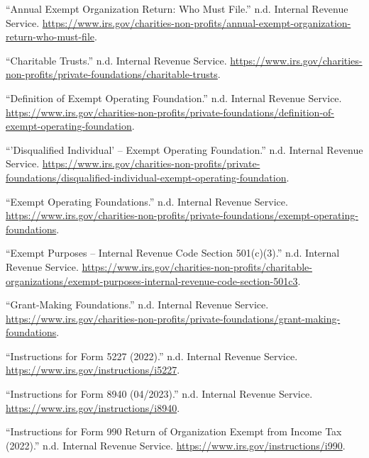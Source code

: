 \documentclass[
  letterpaper,
  DIV=11,
  numbers=noendperiod]{scrreprt}
\newlength{\cslhangindent}
\newlength{\cslentryspacingunit} %
\newenvironment{CSLReferences}[2] %
 {%
  \setlength{\parindent}{0pt}
  \ifodd #1
  \let\oldpar\par
  \def\par{\hangindent=\cslhangindent\oldpar}
  \fi
  \setlength{\parskip}{#2\cslentryspacingunit}
 }%
 {}
\begin{document}
\hypertarget{refs}{}
\begin{CSLReferences}{1}{0}
\leavevmode{}%
{``Annual Exempt Organization Return: Who Must File.''} n.d. Internal
Revenue Service.
\url{https://www.irs.gov/charities-non-profits/annual-exempt-organization-return-who-must-file}.

\leavevmode{}%
{``Charitable Trusts.''} n.d. Internal Revenue Service.
\url{https://www.irs.gov/charities-non-profits/private-foundations/charitable-trusts}.

\leavevmode{}%
{``Definition of Exempt Operating Foundation.''} n.d. Internal Revenue
Service.
\url{https://www.irs.gov/charities-non-profits/private-foundations/definition-of-exempt-operating-foundation}.

\leavevmode{}%
{``'Disqualified Individual' -- Exempt Operating Foundation.''} n.d.
Internal Revenue Service.
\url{https://www.irs.gov/charities-non-profits/private-foundations/disqualified-individual-exempt-operating-foundation}.

\leavevmode{}%
{``Exempt Operating Foundations.''} n.d. Internal Revenue Service.
\url{https://www.irs.gov/charities-non-profits/private-foundations/exempt-operating-foundations}.

\leavevmode{}%
{``Exempt Purposes -- Internal Revenue Code Section 501(c)(3).''} n.d.
Internal Revenue Service.
\url{https://www.irs.gov/charities-non-profits/charitable-organizations/exempt-purposes-internal-revenue-code-section-501c3}.

\leavevmode{}%
{``Grant-Making Foundations.''} n.d. Internal Revenue Service.
\url{https://www.irs.gov/charities-non-profits/private-foundations/grant-making-foundations}.

\leavevmode{}%
{``Instructions for Form 5227 (2022).''} n.d. Internal Revenue Service.
\url{https://www.irs.gov/instructions/i5227}.

\leavevmode{}%
{``Instructions for Form 8940 (04/2023).''} n.d. Internal Revenue
Service. \url{https://www.irs.gov/instructions/i8940}.

\leavevmode{}%
{``Instructions for Form 990 Return of Organization Exempt from Income
Tax (2022).''} n.d. Internal Revenue Service.
\url{https://www.irs.gov/instructions/i990}.


\end{CSLReferences}
\end{document}
